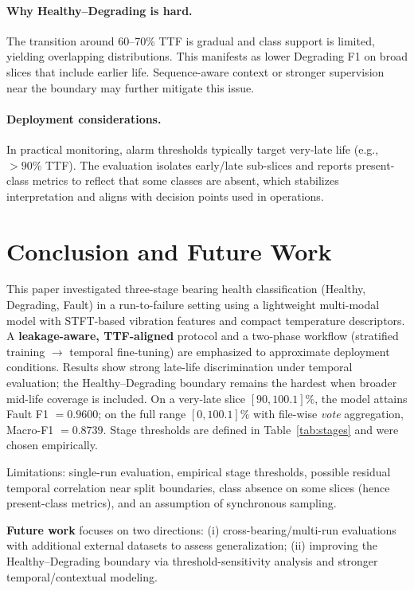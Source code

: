 \documentclass[pdflatex,sn-mathphys-num]{sn-jnl}%
\begin{document}
\paragraph{Why Healthy--Degrading is hard.}
The transition around 60--70\% TTF is gradual and class support is limited, yielding overlapping distributions. This manifests as lower Degrading F1 on broad slices that include earlier life. Sequence-aware context or stronger supervision near the boundary may further mitigate this issue.

\paragraph{Deployment considerations.}
In practical monitoring, alarm thresholds typically target very-late life (e.g., $>90\%$ TTF). The evaluation isolates early/late sub-slices and reports present-class metrics to reflect that some classes are absent, which stabilizes interpretation and aligns with decision points used in operations.
\FloatBarrier

\section{Conclusion and Future Work}
\label{sec:conclusion}

This paper investigated three-stage bearing health classification (Healthy, Degrading, Fault) in a run-to-failure setting using a lightweight multi-modal model with STFT-based vibration features and compact temperature descriptors. A \textbf{leakage-aware, TTF-aligned} protocol and a two-phase workflow (stratified training $\rightarrow$ temporal fine-tuning) are emphasized to approximate deployment conditions. Results show strong late-life discrimination under temporal evaluation; the Healthy--Degrading boundary remains the hardest when broader mid-life coverage is included. On a very-late slice $[90,100.1]\%$, the model attains Fault F1 $=0.9600$; on the full range $[0,100.1]\%$ with file-wise \emph{vote} aggregation, Macro-F1 $=0.8739$. Stage thresholds are defined in Table~\ref{tab:stages} and were chosen empirically.

Limitations: single-run evaluation, empirical stage thresholds, possible residual temporal correlation near split boundaries, class absence on some slices (hence present-class metrics), and an assumption of synchronous sampling.

\textbf{Future work} focuses on two directions: (i) cross-bearing/multi-run evaluations with additional external datasets to assess generalization; (ii) improving the Healthy--Degrading boundary via threshold-sensitivity analysis and stronger temporal/contextual modeling.

\begingroup
\sloppy
\small
% 
\endgroup
\end{document}
